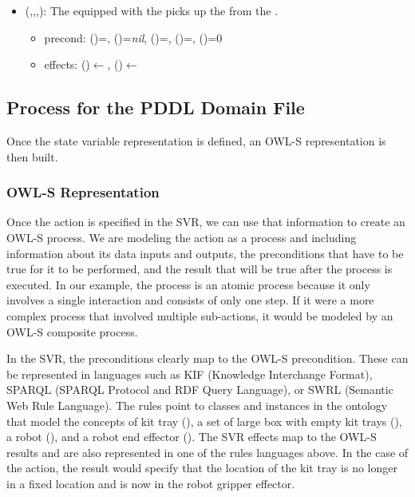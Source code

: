 \begin{itemize}
\item {}(,,,): The   equipped with the   picks up the   from the  .
\begin{itemize}
\item precond: ()=, ()=\textit{nil}, ()=, ()=, ()=0
\item effects: ()$\leftarrow$, ()$\leftarrow$
\end{itemize}
\end{itemize}




\subsection{Process for the PDDL Domain File}
\label{subsect:PDDL_Domain_File}
Once the state variable representation is defined, an OWL-S representation is then built.

\subsubsection{OWL-S Representation}
Once the action is specified in the SVR, we can use that information to create an OWL-S process. We are modeling the action as a process and including information about its data inputs and outputs, the preconditions that have to be true for it to be performed, and the result that will be true after the process is executed. In our example, the process is an atomic process because it only involves a single interaction and consists of only one step. If it were a more complex process that involved multiple sub-actions, it would be modeled by an OWL-S composite process.

In the SVR, the preconditions clearly map to the OWL-S precondition. These can be represented in languages such as KIF \cite{KIF} (Knowledge Interchange Format), SPARQL \cite{SPARQL} (SPARQL Protocol and RDF Query Language), or SWRL \cite{SWRL-W3C} (Semantic Web Rule Language). The rules point to classes and instances in the ontology that model the concepts of kit tray (), a set of large box with empty kit trays (), a robot (), and a robot end effector (). The SVR effects map to the OWL-S results and are also represented in one of the rules languages above. In the case of the  action, the result would specify that the location of the kit tray is no longer in a fixed location and is now in the robot gripper effector.

